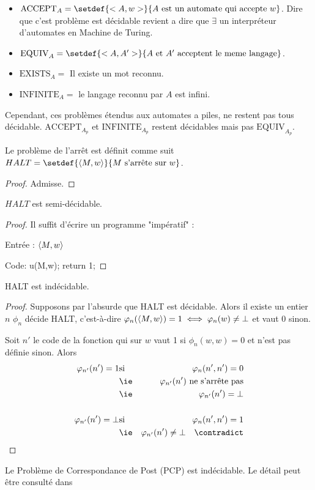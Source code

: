 \begin{itemize}
	\item $\text{ACCEPT}_A = \setdef {<A,w>} {A \text { est un automate qui accepte } w}$.
	      Dire que c'est problème est décidable revient a dire que $\exists$ un interpréteur d'automates en Machine de Turing.
	\item $\text{EQUIV}_A = \setdef {<A,A'>} {A \text { et } A' \text{ acceptent le meme langage}}$.
	\item $\text{EXISTS}_A = $ Il existe un mot reconnu.
	\item $\text{INFINITE}_A = $ le langage reconnu par $A$ est infini.
\end{itemize}

Cependant, ces problèmes étendus aux automates a piles, ne restent pas tous décidable.
$\text{ACCEPT}_{A_p}$ et $\text{INFINITE}_{A_p}$ restent décidables mais pas $\text{EQUIV}_{A_p}$.

\begin{definition}
	Le problème de l'arrêt est définit comme suit $HALT = \setdef {\encode{M,w}} {M \text{ s'arrête sur } w}$.
\end{definition}

\begin{proof}
	Admisse.
\end{proof}

\begin{prop}
	$HALT$ est semi-décidable.
\end{prop}

\begin{proof}
	Il suffit d'écrire un programme "impératif" :

	Entrée : $\left\langle M,w\right\rangle$

	Code:
	u(M,w);
	return 1;

\end{proof}

\begin{prop}
	HALT est indécidable.
\end{prop}

\begin{proof}
	Supposons par l'absurde que HALT est décidable. Alors il existe un entier $n$ \tq $\phi_n$ décide HALT, c'est-à-dire
	$ \varphi_n(\left\langle M, w\right\rangle ) = 1 \iff \varphi_n(w) \neq \bot $ et vaut $0$ sinon.

	Soit $n'$ le code de la fonction qui sur $w$ vaut 1 si $\phi_n (w,w) = 0 $ et n'est pas définie sinon. Alors
	\begin{eqnarray*}
		\phi_{n'}(n') = 1 & \text{si} & \phi_n(n',n') = 0\\
		&\text{\ie}& \phi_{n'}(n') \text{ ne s'arrête pas} \\
		&\text{\ie}& \phi_{n'}(n') = \bot\\\\
		\phi_{n'}(n') = \bot & \text{si} & \phi_n(n',n') = 1\\
		&\text{\ie}& \phi_{n'}(n') \neq \bot \quad \contradict
	\end{eqnarray*}
\end{proof}

\begin{exemple}
	Le Problème de Correspondance de Post (PCP) est indécidable. Le détail peut être consulté dans \cite[Chapter~5.2]{sipser}
\end{exemple}
